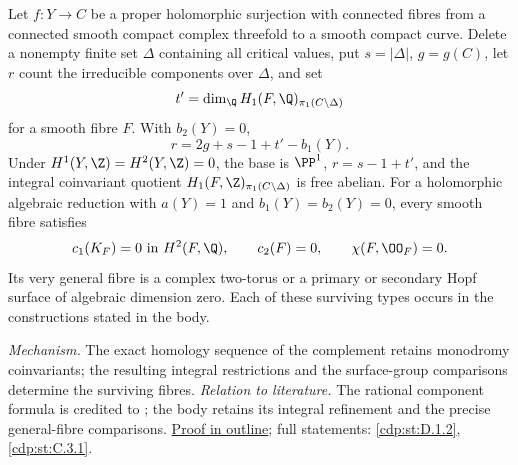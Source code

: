 \hypertarget{main-II-B}{}
\begin{maintheorem}
\hypertarget{tag-03K3}{}\label{series:II:B}

Let $f:Y\to C$ be a proper holomorphic surjection with connected
fibres from a connected smooth compact complex threefold to a
smooth compact curve. Delete a nonempty finite set $\Delta$
containing all critical values, put $s=|\Delta|$, $g=g(C)$,
let $r$ count the irreducible components over $\Delta$, and set
\[
 t'=\dim_\Q H_1(F,\Q)_{\pi_1(C\setminus\Delta)}
\]
for a smooth fibre $F$. With $b_2(Y)=0$,
\[
 r=2g+s-1+t'-b_1(Y).
\]
Under $H^1(Y,\Z)=H^2(Y,\Z)=0$, the base is $\PP^1$,
$r=s-1+t'$, and the integral coinvariant quotient
$H_1(F,\Z)_{\pi_1(C\setminus\Delta)}$ is free abelian.
For a holomorphic algebraic reduction with $a(Y)=1$ and
$b_1(Y)=b_2(Y)=0$, every smooth fibre satisfies
\[
 c_1(K_F)=0\text{ in }H^2(F,\Q),\qquad
 c_2(F)=0,\qquad \chi(F,\OO_F)=0.
\]
Its very general fibre is a complex two-torus or a primary or
secondary Hopf surface of algebraic dimension zero. Each of these
surviving types occurs in the constructions stated in the body.

\end{maintheorem}

\textit{Mechanism.} The exact homology sequence of the complement
retains monodromy coinvariants; the resulting integral restrictions
and the surface-group comparisons determine the surviving fibres.
\textit{Relation to literature.} The rational component formula is
credited to \cite[\S10.5, p.~91]{AC2026}; the body retains its
integral refinement and the precise general-fibre comparisons.
\hyperlink{outline-II-B}{Proof in outline}; full statements:
\ref{cdp:st:D.1.2}, \ref{cdp:st:C.3.1}.

